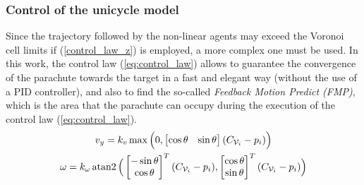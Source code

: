 \subsubsection{Control of the unicycle model}
Since the trajectory followed by the non-linear agents may exceed the Voronoi cell limits if (\ref{control_law_z}) is employed, a more complex one must be used. In this work, the control law (\ref{eq:control_law}) \cite{b4} allows to guarantee the convergence of the parachute towards the target in a fast and elegant way (without the use of a PID controller), and also to find the so-called \textit{Feedback Motion Predict (FMP)}, which is the area that the parachute can occupy during the execution of the control law (\ref{eq:control_law}).
\begin{equation}
\label{eq:control_law}
    \begin{gathered}
        v_y = k_v\max\Big(0,\begin{bmatrix}
           \cos{\theta} & \sin{\theta}
       \end{bmatrix}(C_{\mathcal{V}_i} -p_i)\Big)\\
        \omega = k_{\omega}\atantwo\Big(\begin{bmatrix}
           -\sin{\theta} \\ \cos{\theta}
       \end{bmatrix}^T(C_{\mathcal{V}_i} -p_i),\begin{bmatrix}
           \cos{\theta} \\ \sin{\theta}
       \end{bmatrix}^T(C_{\mathcal{V}_i} -p_i)\Big)
    \end{gathered}
\end{equation}
